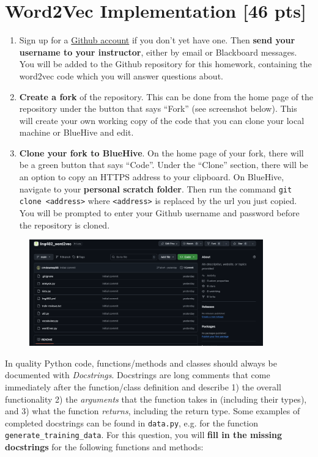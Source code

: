 \documentclass[11pt]{article}
\begin{document}
\section{Word2Vec Implementation [46 pts]}
\begin{enumerate}[label=\alph*.]
  \item Sign up for a \href{https://github.com}{Github account} if you don't yet have one. Then \textbf{send your username to your instructor}, either by email or Blackboard messages. You will be added to the Github repository for this homework, containing the word2vec code which you will answer questions about.
  \item \textbf{Create a fork} of the repository. This can be done from the home page of the repository under the button that says ``Fork'' (see screenshot below). This will create your own working copy of the code that you can clone your local machine or BlueHive and edit.
  \item \textbf{Clone your fork to BlueHive}. On the home page of your fork, there will be a green button that says ``Code''. Under the ``Clone'' section, there will be an option to copy an HTTPS address to your clipboard. On BlueHive, navigate to your \textbf{personal scratch folder}. Then run the command \texttt{git clone <address>} where \texttt{<address>} is replaced by the url you just copied. You will be prompted to enter your Github username and password before the repository is cloned.
\end{enumerate}

\begin{figure}[h!]
  \includegraphics[width=0.9\textwidth]{repo_buttons.png}
  \centering
\end{figure}

\newpage
{} In quality Python code, functions/methods and classes should always be documented with \textit{Docstrings}. Docstrings are long comments that come immediately after the function/class definition and describe 1) the overall functionality 2) the \textit{arguments} that the function takes in (including their types), and 3) what the function \textit{returns}, including the return type. Some examples of completed docstrings can be found in \texttt{data.py}, e.g. for the function \texttt{generate\_training\_data}. For this question, you will \textbf{fill in the missing docstrings} for the following functions and methods:
\end{document}
